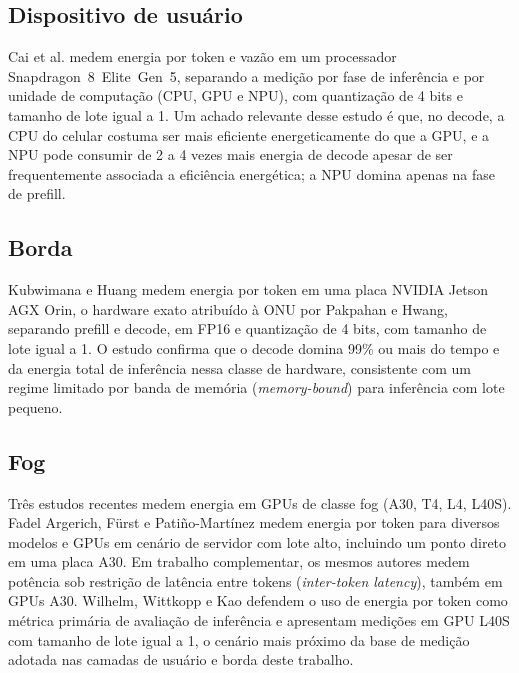 \documentclass[cic,dipl]{infufrgs}
\begin{document}
\subsection{Dispositivo de usu\'ario}

Cai et al. \cite{cai2026npu} medem energia por token e vaz\~ao em um
processador Snapdragon~8~Elite~Gen~5, separando a medi\c{c}\~ao por fase
de infer\^encia e por unidade de computa\c{c}\~ao (CPU, GPU e NPU), com
quantiza\c{c}\~ao de 4 bits e tamanho de lote igual a 1. Um achado
relevante desse estudo \'e que, no decode, a CPU do celular costuma ser
mais eficiente energeticamente do que a GPU, e a NPU pode consumir de 2 a
4 vezes mais energia de decode apesar de ser frequentemente associada a
efici\^encia energ\'etica; a NPU domina apenas na fase de prefill.

\subsection{Borda}

Kubwimana e Huang \cite{kubwimana2025edgereasoning} medem energia por
token em uma placa NVIDIA Jetson AGX Orin, o hardware exato atribu\'ido
\`a ONU por Pakpahan e Hwang, separando prefill e decode, em FP16 e
quantiza\c{c}\~ao de 4 bits, com tamanho de lote igual a 1. O estudo
confirma que o decode domina 99\% ou mais do tempo e da energia total de
infer\^encia nessa classe de hardware, consistente com um regime
limitado por banda de mem\'oria (\emph{memory-bound}) para infer\^encia
com lote pequeno.

\subsection{Fog}

Tr\^es estudos recentes medem energia em GPUs de classe fog (A30, T4,
L4, L40S). Fadel Argerich, F\"urst e Pati\~no-Mart\'inez
\cite{fadelargerich2026wattcounts} medem energia por token para
diversos modelos e GPUs em cen\'ario de servidor com lote alto,
incluindo um ponto direto em uma placa A30. Em trabalho complementar,
os mesmos autores \cite{fadelargerich2026wattgpu} medem pot\^encia sob
restri\c{c}\~ao de lat\^encia entre tokens (\emph{inter-token latency}),
tamb\'em em GPUs A30. Wilhelm, Wittkopp e Kao
\cite{wilhelm2026energypertoken} defendem o uso de energia por token
como m\'etrica prim\'aria de avalia\c{c}\~ao de infer\^encia e
apresentam medi\c{c}\~oes em GPU L40S com tamanho de lote igual a 1,
o cen\'ario mais pr\'oximo da base de medi\c{c}\~ao adotada nas camadas
de usu\'ario e borda deste trabalho.
\end{document}
